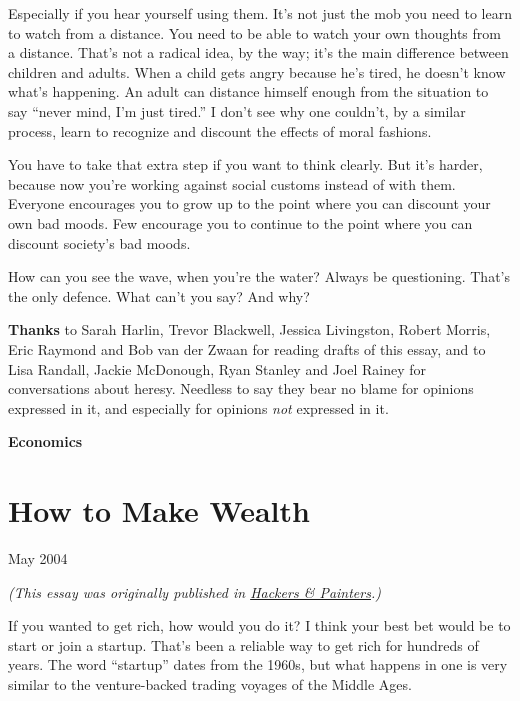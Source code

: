 \documentclass[12pt]{book}
\begin{document}
Especially if you hear yourself using them. It's not just the mob you
need to learn to watch from a distance. You need to be able to watch
your own thoughts from a distance. That's not a radical idea, by the
way; it's the main difference between children and adults. When a child
gets angry because he's tired, he doesn't know what's happening. An
adult can distance himself enough from the situation to say ``never
mind, I'm just tired.'' I don't see why one couldn't, by a similar
process, learn to recognize and discount the effects of moral fashions.

You have to take that extra step if you want to think clearly. But it's
harder, because now you're working against social customs instead of
with them. Everyone encourages you to grow up to the point where you can
discount your own bad moods. Few encourage you to continue to the point
where you can discount society's bad moods.

How can you see the wave, when you're the water? Always be questioning.
That's the only defence. What can't you say? And why?

\textbf{Thanks} to Sarah Harlin, Trevor Blackwell, Jessica Livingston,
Robert Morris, Eric Raymond and Bob van der Zwaan for reading drafts of
this essay, and to Lisa Randall, Jackie McDonough, Ryan Stanley and Joel
Rainey for conversations about heresy. Needless to say they bear no
blame for opinions expressed in it, and especially for opinions
\emph{not} expressed in it.

\clearpage
\thispagestyle{empty}
\vspace*{\fill}
\begin{center}
{\LARGE\bfseries Economics}
\end{center}
\vspace*{\fill}
\clearpage

\chapter{How to Make Wealth}

May 2004

\emph{(This essay was originally published in
\href{http://www.amazon.com/gp/product/0596006624/104-0572701-7443937}{Hackers
\& Painters}.)}

If you wanted to get rich, how would you do it? I think your best bet
would be to start or join a startup. That's been a reliable way to get
rich for hundreds of years. The word ``startup'' dates from the 1960s,
but what happens in one is very similar to the venture-backed trading
voyages of the Middle Ages.
\end{document}

